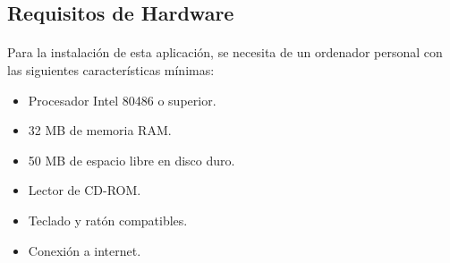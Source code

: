 \subsection{Requisitos de Hardware}

  \paragraph{}Para la instalación de esta aplicación, se necesita de un
  ordenador personal con las siguientes características mínimas:

  \begin{itemize}
   \item Procesador Intel 80486 o superior.
   \item 32 MB de memoria RAM.
   \item 50 MB de espacio libre en disco duro.
   \item Lector de CD-ROM.
   \item Teclado y ratón compatibles.
   \item Conexión a internet.
  \end{itemize}

